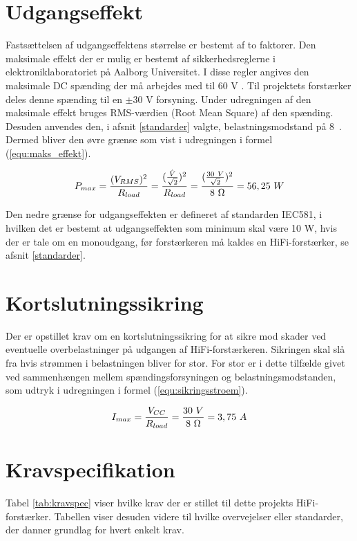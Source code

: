 \section{Udgangseffekt}
\label{valg_udgangseffekt}
Fastsættelsen af udgangseffektens størrelse er bestemt af to faktorer. Den maksimale effekt der er mulig er bestemt af sikkerhedsreglerne i elektroniklaboratoriet på Aalborg Universitet. I disse regler angives den maksimale DC spænding der må arbejdes med til 60 V \cite{elregler-b1101}. 
Til projektets forstærker deles denne spænding til en $\pm$30 V forsyning. Under udregningen af den maksimale effekt bruges RMS-værdien (Root Mean Square) af den spænding. Desuden anvendes den, i afsnit \ref{standarder} valgte, belastningsmodstand på 8~\ohm. Dermed bliver den øvre grænse som vist i udregningen i formel (\ref{equ:maks_effekt}).

\begin{equation}
\label{equ:maks_effekt}
P_{max} = \frac{(V_{RMS})^2}{R_{load}}= \frac{(\frac{\hat{V}}{\sqrt{2}})^2}{R_{load}} = \frac{(\frac{30~V}{\sqrt{2}})^2}{8~\ohm} = 56,25~W
\end{equation}

Den nedre grænse for udgangseffekten er defineret af standarden IEC581, i hvilken det er bestemt at udgangseffekten som minimum skal være 10 W, hvis der er tale om en monoudgang, før forstærkeren må kaldes en HiFi-forstærker, se afsnit \ref{standarder}.

\section{Kortslutningssikring}
\label{valg_kortslutningssikring}
Der er opstillet krav om en kortslutningssikring for at sikre mod skader ved eventuelle overbelastninger på udgangen af HiFi-forstærkeren. Sikringen skal slå fra hvis strømmen i belastningen bliver for stor. For stor er i dette tilfælde givet ved sammenhængen mellem spændingsforsyningen og belastningsmodstanden, som udtryk i udregningen i formel (\ref{equ:sikringsstroem}).

\begin{equation}
\label{equ:sikringsstroem}
I_{max}=\frac{V_{CC}}{R_{load}}=\frac{30~V}{8~\ohm}=3,75~A
\end{equation}

\section{Kravspecifikation}
\label{kravspecifikation}
Tabel \ref{tab:kravspec} viser hvilke krav der er stillet til dette projekts HiFi-forstærker. Tabellen viser desuden videre til hvilke overvejelser eller standarder, der danner grundlag for hvert enkelt krav.

